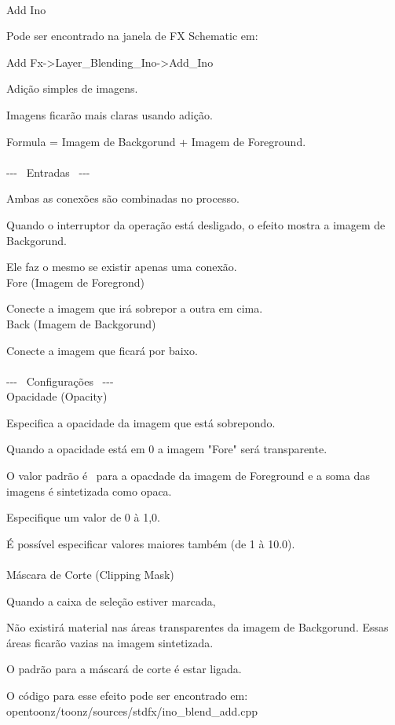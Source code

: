 \documentclass[a4paper,12pt]{article}
\begin{document}
\thispagestyle{empty}

\Large
\noindent \\
Add Ino\medskip
\par
\normalsize
Pode ser encontrado na janela de FX Schematic em:\par
Add Fx->Layer\_Blending\_Ino->Add\_Ino\par
Adição simples de imagens.\par
Imagens ficarão mais claras usando adição.\par
Formula = Imagem de Backgorund + Imagem de Foreground.\\
\\
-{-}- \ Entradas \ -{-}-\par
Ambas as conexões são combinadas no processo.\par
Quando o interruptor da operação está desligado, o efeito mostra a imagem de Backgorund.\par
Ele faz o mesmo se existir apenas uma conexão.\\
Fore (Imagem de Foregrond)\par
Conecte a imagem que irá sobrepor a outra em cima.\\
Back (Imagem de Backgorund)\par
Conecte a imagem que ficará por baixo.\\
\\
-{-}- \ Configurações \ -{-}-\\
Opacidade (Opacity)\par
Especifica a opacidade da imagem que está sobrepondo.\par
Quando a opacidade está em 0 a imagem "Fore" será transparente.\par
O valor padrão é \textquotedbl \ para a opacdade da imagem de Foreground e a soma das imagens é sintetizada como opaca.\par
Especifique um valor de 0 à 1,0.\par
É possível especificar valores maiores também (de 1 à 10.0).\\
\\
Máscara de Corte (Clipping Mask)\par
Quando a caixa de seleção estiver marcada,\par
Não existirá material nas áreas transparentes da imagem de Backgorund. Essas áreas ficarão vazias na imagem sintetizada.\par
O padrão para a máscará de corte é estar ligada.

O código para esse efeito pode ser encontrado em: opentoonz/toonz/sources/stdfx/ino\_blend\_add.cpp
\end{document}
